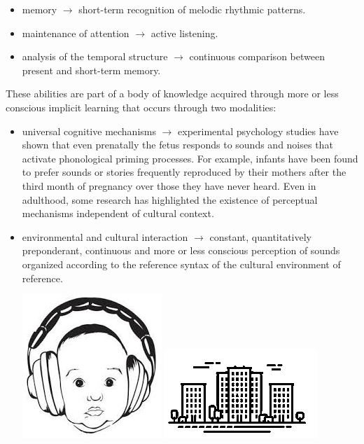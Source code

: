 \begin{itemize}
\tightlist
\item memory \(\rightarrow\) short-term recognition of melodic rhythmic patterns.
\item maintenance of attention \(\rightarrow\) active listening.
\item analysis of the temporal structure \(\rightarrow\) continuous comparison between present and short-term memory.
\end{itemize}

These abilities are part of a body of knowledge acquired through more or less conscious implicit learning that occurs through two modalities:

\begin{itemize}
\tightlist
\item universal cognitive mechanisms \(\rightarrow\) experimental psychology studies have shown that even prenatally the fetus responds to sounds and noises that activate phonological priming processes. For example, infants have been found to prefer sounds or stories frequently reproduced by their mothers after the third month of pregnancy over
those they have never heard. Even in adulthood, some research has highlighted the existence of perceptual mechanisms independent of cultural context.

\item environmental and cultural interaction \(\rightarrow\) constant, quantitatively preponderant, continuous and more or less conscious perception of sounds organized according to the reference syntax of the cultural environment of reference.
  
\begin{center}
\includegraphics[scale=0.28]{../img/prenatale.png}
\includegraphics[scale=0.55]{../img/metro.png}
\end{center}
\end{itemize}

